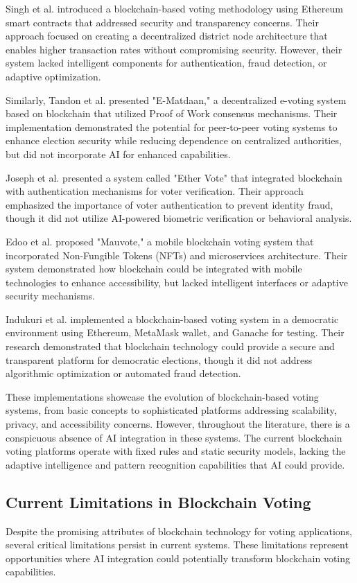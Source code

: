 \documentclass[conference]{IEEEtran}
\begin{document}
Singh et al. \cite{b5} introduced a blockchain-based voting methodology using Ethereum smart contracts that addressed security and transparency concerns. Their approach focused on creating a decentralized district node architecture that enables higher transaction rates without compromising security. However, their system lacked intelligent components for authentication, fraud detection, or adaptive optimization.

Similarly, Tandon et al. \cite{b3} presented "E-Matdaan," a decentralized e-voting system based on blockchain that utilized Proof of Work consensus mechanisms. Their implementation demonstrated the potential for peer-to-peer voting systems to enhance election security while reducing dependence on centralized authorities, but did not incorporate AI for enhanced capabilities.

Joseph et al. \cite{b6} presented a system called "Ether Vote" that integrated blockchain with authentication mechanisms for voter verification. Their approach emphasized the importance of voter authentication to prevent identity fraud, though it did not utilize AI-powered biometric verification or behavioral analysis.

Edoo et al. \cite{b7} proposed "Mauvote," a mobile blockchain voting system that incorporated Non-Fungible Tokens (NFTs) and microservices architecture. Their system demonstrated how blockchain could be integrated with mobile technologies to enhance accessibility, but lacked intelligent interfaces or adaptive security mechanisms.

Indukuri et al. \cite{b8} implemented a blockchain-based voting system in a democratic environment using Ethereum, MetaMask wallet, and Ganache for testing. Their research demonstrated that blockchain technology could provide a secure and transparent platform for democratic elections, though it did not address algorithmic optimization or automated fraud detection.

These implementations showcase the evolution of blockchain-based voting systems, from basic concepts to sophisticated platforms addressing scalability, privacy, and accessibility concerns. However, throughout the literature, there is a conspicuous absence of AI integration in these systems. The current blockchain voting platforms operate with fixed rules and static security models, lacking the adaptive intelligence and pattern recognition capabilities that AI could provide.

\subsection{Current Limitations in Blockchain Voting}
Despite the promising attributes of blockchain technology for voting applications, several critical limitations persist in current systems. These limitations represent opportunities where AI integration could potentially transform blockchain voting capabilities.
\end{document}
